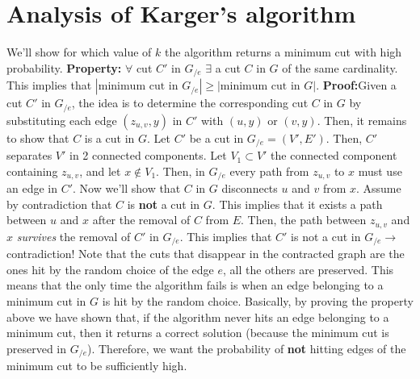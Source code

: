 \section{Analysis of Karger's algorithm}
We'll show for which value of $k$ the algorithm returns a minimum cut with high probability.\newline\newline
\textbf{Property:} $\forall$ cut $C'$ in $G_{/e}$ $\exists$ a cut $C$ in $G$ of the same cardinality.\newline\newline
This implies that $|\text{minimum cut in }G_{/e}| \geq |\text{minimum cut in } G|$.\newline\newline
\textbf{Proof:}Given a cut $C'$ in $G_{/e}$, the idea is to determine the corresponding cut $C$ in $G$ by substituting each edge $(z_{u, v}, y)$ in $C'$ with $(u, y)$ or $(v, y)$. Then, it remains to show that $C$ is a cut in $G$.\newline\newline
Let $C'$ be a cut in $G_{/e} = (V', E')$. Then, $C'$ separates $V'$ in 2 connected components. Let $V_1 \subset V'$ the connected component containing $z_{u,v}$, and let $x \notin V_1$. Then, in $G_{/e}$ every path from $z_{u, v}$ to $x$ must use an edge in $C'$.\newline\newline
Now we'll show that $C$ in $G$ disconnects $u$ and $v$ from $x$. Assume by contradiction that $C$ is \textbf{not} a cut in $G$. This implies that it exists a path between $u$ and $x$ after the removal of $C$ from $E$. Then, the path between $z_{u, v}$ and $x$ \textit{survives} the removal of $C'$ in $G_{/e}$. This implies that $C'$ is not a cut in $G_{/e} \rightarrow$ contradiction!\newline\newline
Note that the cuts that disappear in the contracted graph are the ones hit by the random choice of the edge $e$, all the others are preserved. This means that the only time the algorithm fails is when an edge belonging to a minimum cut in $G$ is hit by the random choice. Basically, by proving the property above we have shown that, if the algorithm never hits an edge belonging to a minimum cut, then it returns a correct solution (because the minimum cut is preserved in $G_{/e}$).\newline\newline
Therefore, we want the probability of \textbf{not} hitting edges of the minimum cut to be sufficiently high.

